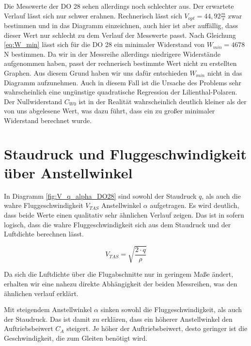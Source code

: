 Die Messwerte der DO 28 sehen allerdings noch schlechter aus. Der erwartete Verlauf lässt sich nur schwer erahnen. Rechnerisch lässt sich $V_{opt} = 44,92 \frac{m}{s}$ zwar bestimmen und in das Diagramm einzeichnen, auch hier ist aber auffällig, dass dieser Wert nur schlecht zu dem Verlauf der Messwerte passt. Nach Gleichung \ref{eq:W_min} lässt sich für die DO 28 ein minimaler Widerstand von $W_{min} = 4678$ N bestimmen. Da wir in der Messreihe allerdings niedrigere Widerstände aufgenommen haben, passt der rechnerisch bestimmte Wert nicht zu erstellten Graphen. Aus diesem Grund haben wir uns dafür entschieden $W_{min}$ nicht in das Diagramm aufzunehmen. Auch in diesem Fall ist die Ursache des Problems sehr wahrscheinlich eine ungünstige quadratische Regression der Lilienthal-Polaren. Der Nullwiderstand $C_{W0}$ ist in der Realität wahrscheinlich deutlich kleiner als der von uns abgelesene Wert, was dazu führt, dass ein zu großer minimaler Widerstand berechnet wurde.

\section{Staudruck und Fluggeschwindigkeit über Anstellwinkel}
In Diagramm \ref{fig:V_q_alpha_DO28} sind sowohl der Staudruck $q$, als auch die wahre Fluggeschwindigkeit $V_{TAS}$ Anstellwinkel $\alpha$ aufgetragen. Es wird deutlich, dass beide Werte einen qualitativ sehr ähnlichen Verlauf zeigen. Das ist in sofern logisch, dass die wahre Fluggeschwindigkeit sich aus dem Staudruck und der Luftdichte berechnen lässt.

\begin{equation}
V_{TAS}= \sqrt{\frac{2 \cdot q}{\rho}}
\end{equation}

Da sich die Luftdichte über die Flugabschnitte nur in geringem Maße ändert, erhalten wir eine nahezu direkte Abhängigkeit der beiden Messreihen, was den ähnlichen verlauf erklärt. 

Mit steigendem Anstellwinkel $\alpha$ sinken sowohl die Fluggeschwindigkeit, als auch der Staudruck. Das ist damit zu erklären, dass ein höherer Anstellwinkel den Auftriebsbeiwert $C_A$ steigert. Je höher der Auftriebsbeiwert, desto geringer ist die Geschwindigkeit, die zum Gleiten benötigt wird. 

